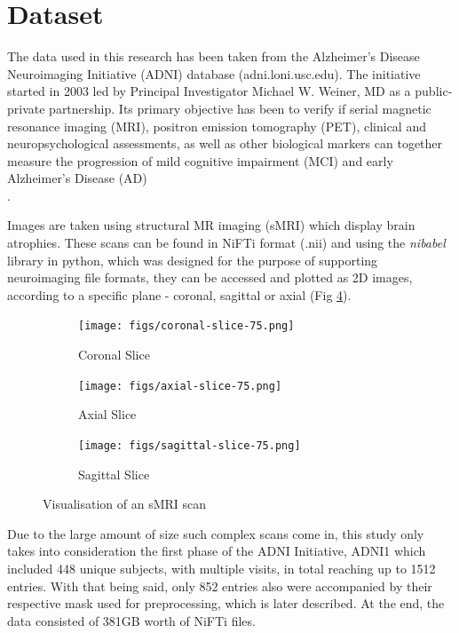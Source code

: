 \documentclass[a4paper, 12pt]{article}
\begin{document}
\newpage
\section{Dataset}
The data used in this research has been taken from the Alzheimer's Disease Neuroimaging Initiative (ADNI)
database (adni.loni.usc.edu). The initiative started in 2003 led by Principal Investigator Michael W. Weiner, MD
as a public-private partnership. Its primary objective has been to verify if serial magnetic resonance imaging (MRI),
positron emission tomography (PET), clinical and neuropsychological assessments, as well as other biological markers
can together measure the progression of mild cognitive impairment (MCI) and early Alzheimer's Disease (AD)\\
\cite{PMID20042704}.


Images are taken using structural MR imaging (sMRI) which display brain atrophies. These scans can be found in
NiFTi format (.nii) and using the \textit{nibabel} library in python, which was designed for the purpose of
supporting neuroimaging file formats, they can be accessed and plotted as 2D images, according to a specific
plane - coronal, sagittal or axial (Fig \ref{fig:images}).

\begin{figure}[htbp]
    \centering
    \begin{subfigure}[b]{0.3\textwidth}
        \centering
        \texttt{[image: figs/coronal-slice-75.png]}
        \caption{Coronal Slice}
        \label{fig:sub1}
    \end{subfigure}
    \begin{subfigure}[b]{0.3\textwidth}
        \centering
        \texttt{[image: figs/axial-slice-75.png]}
        \caption{Axial Slice}
        \label{fig:sub2}
    \end{subfigure}
    \begin{subfigure}[b]{0.3\textwidth}
        \centering
        \texttt{[image: figs/sagittal-slice-75.png]}
        \caption{Sagittal Slice}
        \label{fig:sub3}
    \end{subfigure}
    \caption{Visualisation of an sMRI scan}
    \label{fig:images}
\end{figure}

Due to the large amount of size such complex scans come in, this study only takes into consideration the first phase of the
ADNI Initiative, ADNI1 which included 448 unique subjects, with multiple visits, in total reaching up to 1512 entries.
With that being said, only 852 entries also were accompanied by their respective mask used for preprocessing, which is later
described. At the end, the data consisted of 381GB worth of NiFTi files.
\end{document}
